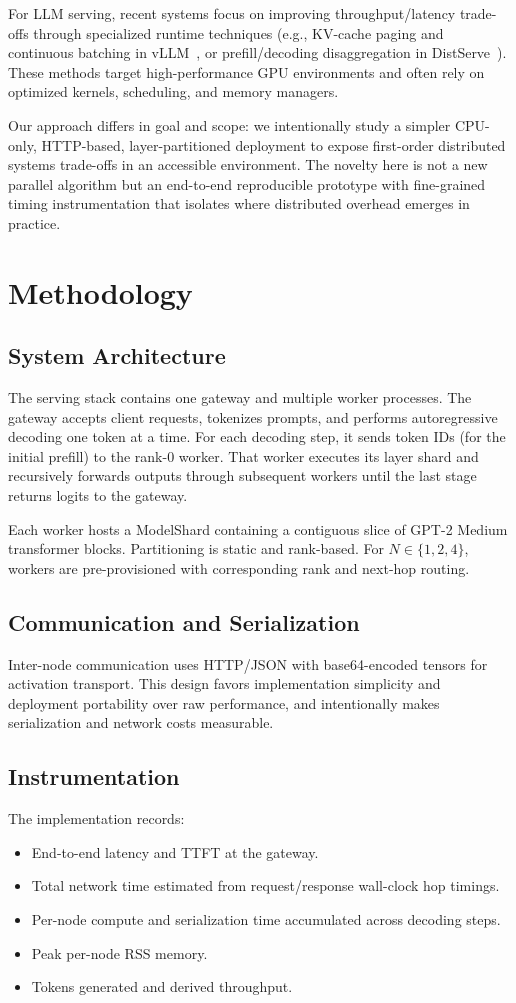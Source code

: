 \documentclass[conference]{IEEEtran}
\begin{document}
For LLM serving, recent systems focus on improving throughput/latency trade-offs through specialized runtime techniques (e.g., KV-cache paging and continuous batching in vLLM~\cite{vllm}, or prefill/decoding disaggregation in DistServe~\cite{distserve}). These methods target high-performance GPU environments and often rely on optimized kernels, scheduling, and memory managers.

Our approach differs in goal and scope: we intentionally study a simpler CPU-only, HTTP-based, layer-partitioned deployment to expose first-order distributed systems trade-offs in an accessible environment. The novelty here is not a new parallel algorithm but an end-to-end reproducible prototype with fine-grained timing instrumentation that isolates where distributed overhead emerges in practice.

\section{Methodology}
\subsection{System Architecture}
The serving stack contains one gateway and multiple worker processes. The gateway accepts client requests, tokenizes prompts, and performs autoregressive decoding one token at a time. For each decoding step, it sends token IDs (for the initial prefill) to the rank-0 worker. That worker executes its layer shard and recursively forwards outputs through subsequent workers until the last stage returns logits to the gateway.

Each worker hosts a ModelShard containing a contiguous slice of GPT-2 Medium transformer blocks. Partitioning is static and rank-based. For \(N\in\{1,2,4\}\), workers are pre-provisioned with corresponding rank and next-hop routing.

\subsection{Communication and Serialization}
Inter-node communication uses HTTP/JSON with base64-encoded tensors for activation transport. This design favors implementation simplicity and deployment portability over raw performance, and intentionally makes serialization and network costs measurable.

\subsection{Instrumentation}
The implementation records:
\begin{itemize}
\item End-to-end latency and TTFT at the gateway.
\item Total network time estimated from request/response wall-clock hop timings.
\item Per-node compute and serialization time accumulated across decoding steps.
\item Peak per-node RSS memory.
\item Tokens generated and derived throughput.
\end{itemize}
\end{document}
